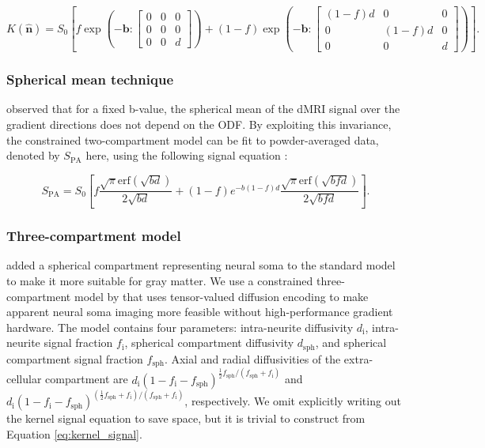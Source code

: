 \documentclass[10pt, letterpaper, oneside]{article}
\begin{document}
\begin{equation}\label{eq:two-compartment_kernel_signal}
 K(\mathbf{\hat{n}}) = S_0 \left[ f \exp\left(- \mathbf{b}:\begin{bmatrix} 0 & 0 & 0 \\ 0 & 0 & 0 \\ 0 & 0 & d \end{bmatrix}\right) + (1-f) \exp\left(- \mathbf{b}:\begin{bmatrix} (1-f)d & 0 & 0 \\ 0 & (1-f)d & 0 \\ 0 & 0 & d \end{bmatrix}\right) \right] .
\end{equation}

\subsubsection{Spherical mean technique}

\cite{kaden2016quantitative} observed that for a fixed b-value, the spherical mean of the dMRI signal over the gradient directions does not depend on the ODF. By exploiting this invariance, the constrained two-compartment model can be fit to powder-averaged data, denoted by $S_\text{PA}$ here, using the following signal equation \citep{kaden2016multi}:

\begin{equation}
S_\text{PA} = S_0 \left[ f \frac{\sqrt{\pi}\text{erf}\left( \sqrt{bd}\right)}{2\sqrt{bd}} + (1-f)e^{-b(1-f)d} \frac{\sqrt{\pi}\text{erf}\left( \sqrt{bfd}\right)}{2\sqrt{bfd}}\right] .
\end{equation}

\subsubsection{Three-compartment model}
 
\cite{palombo2020sandi} added a spherical compartment representing neural soma to the standard model to make it more suitable for gray matter. We use a constrained three-compartment model by \cite{gyori2021potential} that uses tensor-valued diffusion encoding to make apparent neural soma imaging more feasible without high-performance gradient hardware. The model contains four parameters: intra-neurite diffusivity $d_\text{i}$, intra-neurite signal fraction $f_\text{i}$, spherical compartment diffusivity $d_\text{sph}$, and spherical compartment signal fraction $f_\text{sph}$. Axial and radial diffusivities of the extra-cellular compartment are $d_\text{i} (1 - f_\text{i} - f_\text{sph})^{\frac{1}{2} f_\text{sph} / (f_\text{sph} + f_\text{i})}$ and $d_\text{i} (1 - f_\text{i} - f_\text{sph})^{(\frac{1}{2} f_\text{sph} + f_\text{i}) / (f_\text{sph} + f_\text{i})}$, respectively. We omit explicitly writing out the kernel signal equation to save space, but it is trivial to construct from Equation \ref{eq:kernel_signal}.
\end{document}
